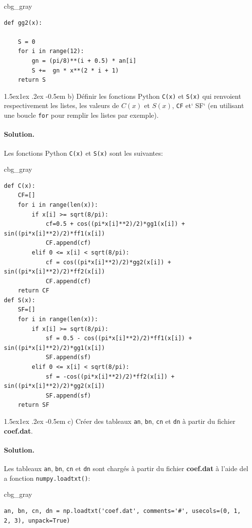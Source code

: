 \documentclass[%
oneside,                 %
final,                   %
10pt,french]{article}
\makeatletter
\newenvironment{_cod_tight}[1]{
   \def\FrameCommand{\colorbox{#1}}
   \FrameRule0.6pt\MakeFramed {\FrameRestore}\vskip3mm}
   {\vskip0mm\endMakeFramed}
\newenvironment{cod}[1]{
\bgroup\rmfamily
\fboxsep=0mm\relax
\begin{_cod_tight}{#1}
\list{}{\parsep=-2mm\parskip=0mm\topsep=0pt\leftmargin=2mm
\rightmargin=2\leftmargin\leftmargin=4pt\relax}
\item\relax}
{\endlist\end{_cod_tight}\egroup}
\newenvironment{doconceexercise}{}{}
\newcommand\subex{\@startsection{paragraph}{4}{\z@}%
                  {1.5ex\@plus1ex \@minus.2ex}%
                  {-0.5em}%
                  {\normalfont\normalsize\bfseries}}
\makeatother
\begin{document}
\begin{doconceexercise}
\begin{cod}{cbg_gray}
\begin{verbatim}
def gg2(x):

    S = 0
    for i in range(12):
        gn = (pi/8)**(i + 0.5) * an[i]
        S +=  gn * x**(2 * i + 1)
    return S
\end{verbatim}
\end{cod}
\noindent


\subex{b)}
Définir les fonctions Python \texttt{C(x)} et \texttt{S(x)} qui renvoient respectivement les listes, les valeurs de $C(x)$ et $S(x)$, \texttt{CF} et` SF` (en utilisant une boucle \texttt{for} pour remplir les listes par exemple).


\paragraph{Solution.}
Les fonctions Python \texttt{C(x)} et \texttt{S(x)} sont les suivantes:

\begin{cod}{cbg_gray}\begin{verbatim}
def C(x):
    CF=[]
    for i in range(len(x)):
        if x[i] >= sqrt(8/pi):
            cf=0.5 + cos((pi*x[i]**2)/2)*gg1(x[i]) + sin((pi*x[i]**2)/2)*ff1(x[i])
            CF.append(cf)
        elif 0 <= x[i] < sqrt(8/pi):
            cf = cos((pi*x[i]**2)/2)*gg2(x[i]) + sin((pi*x[i]**2)/2)*ff2(x[i])
            CF.append(cf)
    return CF
def S(x):
    SF=[]
    for i in range(len(x)):
        if x[i] >= sqrt(8/pi):
            sf = 0.5 - cos((pi*x[i]**2)/2)*ff1(x[i]) + sin((pi*x[i]**2)/2)*gg1(x[i])
            SF.append(sf)
        elif 0 <= x[i] < sqrt(8/pi):
            sf = -cos((pi*x[i]**2)/2)*ff2(x[i]) + sin((pi*x[i]**2)/2)*gg2(x[i])
            SF.append(sf)
    return SF
\end{verbatim}
\end{cod}
\noindent


\subex{c)}
Créer des tableaux \texttt{an}, \texttt{bn}, \texttt{cn} et \texttt{dn} à partir du fichier \textbf{coef.dat}.


\paragraph{Solution.}
Les tableaux \texttt{an}, \texttt{bn}, \texttt{cn} et \texttt{dn} sont chargés  à partir du fichier \textbf{coef.dat} à l'aide del a fonction \texttt{numpy.loadtxt()}:
\begin{cod}{cbg_gray}\begin{verbatim}
an, bn, cn, dn = np.loadtxt('coef.dat', comments='#', usecols=(0, 1, 2, 3), unpack=True)
\end{verbatim}
\end{cod}
\noindent


\end{doconceexercise}
\end{document}
